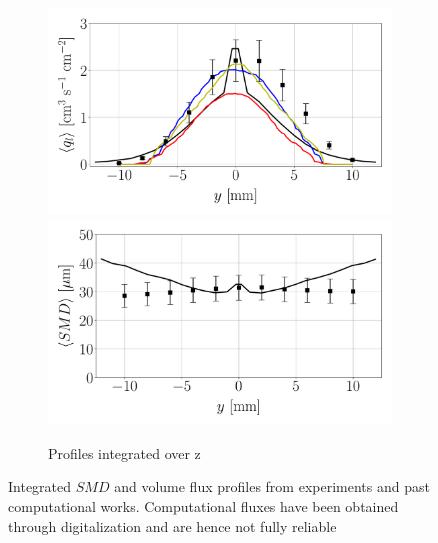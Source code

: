 \begin{figure}[h!]
\begin{subfigure}[b]{0.9\textwidth}
	\centering
   \includegraphics[scale=0.22]{./part2_developments/figures_ch6_lagrangian_JICF/previous_numerical_results/flux_profiles_along_y}
   \includegraphics[scale=0.22]{./part2_developments/figures_ch6_lagrangian_JICF/previous_numerical_results/SMD_profiles_along_y}
   \caption{Profiles integrated over z}
\end{subfigure}
\caption{Integrated $SMD$ and volume flux profiles from experiments and past computational works. Computational fluxes have been obtained through digitalization and are hence not fully reliable }
\label{fig:previous_works_profiles_comparison_with_expe}
\end{figure}

\clearpage

